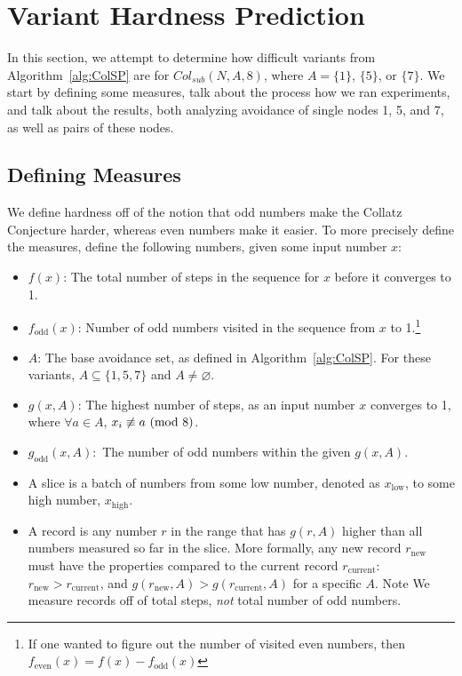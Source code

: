 \chapter{Variant Hardness Prediction} \label{sec:subhrdnspred}
In this section, we attempt to determine how difficult variants from Algorithm~\ref{alg:ColSP} are for $Col_{sub}(N,A,8)$, where $A= \{1\}$, $\{5\}$, or $\{7\}$. We start by defining some measures, talk about the process how we ran experiments, and talk about the results, both analyzing avoidance of single nodes 1, 5, and 7, as well as pairs of these nodes.
\section{Defining Measures} \label{subsec:algdefinemeasure} 
We define hardness off of the notion that odd numbers make the Collatz Conjecture harder, whereas even numbers make it easier. To more precisely define the measures, define the following numbers, given some input number $x$:
\begin{itemize}
    \item $f(x)$: The total number of steps in the sequence for $x$ before it converges to 1.
    \item $f_\text{odd}(x)$: Number of odd numbers visited in the sequence from $x$ to 1.\footnote{If one wanted to figure out the number of visited even numbers, then $f_\text{even}(x) = f(x) - f_\text{odd}(x)$} 
    \item $A$: The base avoidance set, as defined in Algorithm~\ref{alg:ColSP}. For these variants, $A \subseteq \{1, 5, 7\}$ and $A \ne \varnothing$.
    \item $g(x,A)$: The highest number of steps, as an input number $x$ converges to 1, where $\forall a \in A$, $x_i \not\equiv a \ (\mathrm{mod}\ 8)$.
    \item $g_\text{odd}(x,A):$ The number of odd numbers within the given $g(x,A)$.
    \item A slice is a batch of numbers from some low number, denoted as $x_\text{low}$, to some high number, $x_\text{high}$.
    \item A record is any number $r$ in the range that has $g(r,A)$ higher than all numbers measured so far in the slice. More formally, any new record $r_\text{new}$ must have the properties compared to the current record $r_\text{current}$: $r_\text{new} > r_\text{current}$, and $g(r_\text{new},A) > g(r_\text{current},A)$ for a specific $A$. Note We measure records off of total steps, \textit{not} total number of odd numbers.
\end{itemize}
